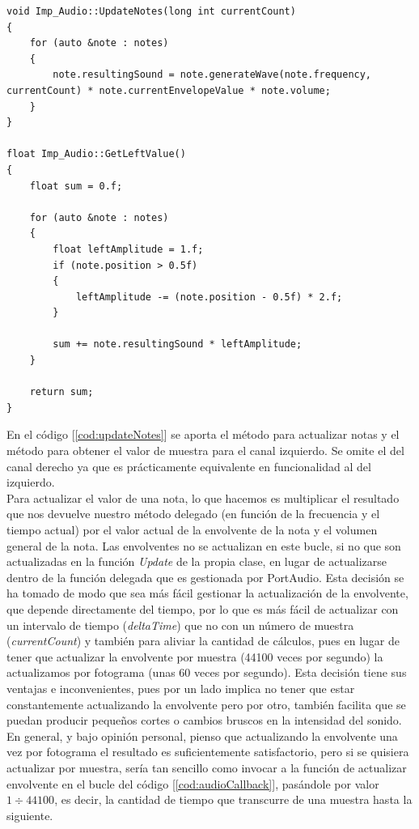 \begin{lstlisting}[style=C-color, caption={Actualización y obtención del valor de las notas},label=cod:updateNotes, escapechar=|]
void Imp_Audio::UpdateNotes(long int currentCount)
{
    for (auto &note : notes)
    {
        note.resultingSound = note.generateWave(note.frequency, currentCount) * note.currentEnvelopeValue * note.volume;
    }
}

float Imp_Audio::GetLeftValue()
{
    float sum = 0.f;

    for (auto &note : notes)
    {
        float leftAmplitude = 1.f;
        if (note.position > 0.5f)
        {
            leftAmplitude -= (note.position - 0.5f) * 2.f;
        }

        sum += note.resultingSound * leftAmplitude;
    }

    return sum;
}
\end{lstlisting}

En el código [\ref{cod:updateNotes}] se aporta el método para actualizar notas y el método para obtener el valor de muestra para el canal izquierdo. Se omite el del canal derecho ya que es prácticamente equivalente en funcionalidad al del izquierdo.\\

Para actualizar el valor de una nota, lo que hacemos es multiplicar el resultado que nos devuelve nuestro método delegado (en función de la frecuencia y el tiempo actual) por el valor actual de la envolvente de la nota y el volumen general de la nota. Las envolventes no se actualizan en este bucle, si no que son actualizadas en la función \emph{Update} de la propia clase, en lugar de actualizarse dentro de la función delegada que es gestionada por PortAudio. Esta decisión se ha tomado de modo que sea más fácil gestionar la actualización de la envolvente, que depende directamente del tiempo, por lo que es más fácil de actualizar con un intervalo de tiempo (\emph{deltaTime}) que no con un número de muestra (\emph{currentCount}) y también para aliviar la cantidad de cálculos, pues en lugar de tener que actualizar la envolvente por muestra (44100 veces por segundo) la actualizamos por fotograma (unas 60 veces por segundo). Esta decisión tiene sus ventajas e inconvenientes, pues por un lado implica no tener que estar constantemente actualizando la envolvente pero por otro, también facilita que se puedan producir pequeños cortes o cambios bruscos en la intensidad del sonido. En general, y bajo opinión personal, pienso que actualizando la envolvente una vez por fotograma el resultado es suficientemente satisfactorio, pero si se quisiera actualizar por muestra, sería tan sencillo como invocar a la función de actualizar envolvente en el bucle del código [\ref{cod:audioCallback}], pasándole por valor \(1 \div 44100\), es decir, la cantidad de tiempo que transcurre de una muestra hasta la siguiente.\\

